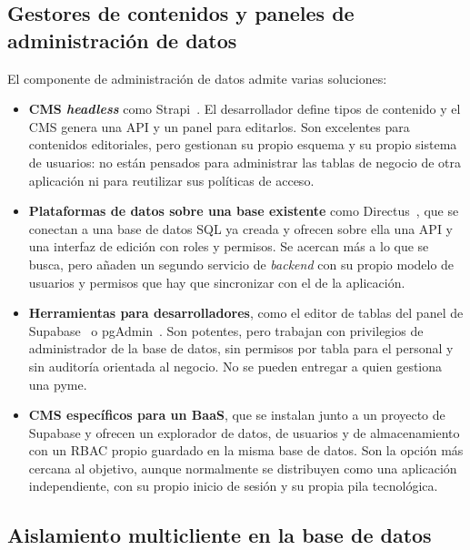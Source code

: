 \subsection{Gestores de contenidos y paneles de administración de datos}
\label{sec:ctx-cms}

El componente de administración de datos admite varias soluciones:

\begin{itemize}
  \item \textbf{CMS \textit{headless}} como Strapi~\cite{strapi-docs}. El
        desarrollador define tipos de contenido y el CMS genera una API y un
        panel para editarlos. Son excelentes para contenidos editoriales,
        pero gestionan su propio esquema y su propio sistema de usuarios: no
        están pensados para administrar las tablas de negocio de otra
        aplicación ni para reutilizar sus políticas de acceso.
  \item \textbf{Plataformas de datos sobre una base existente} como
        Directus~\cite{directus-docs}, que se conectan a una base de datos SQL
        ya creada y ofrecen sobre ella una API y una interfaz de edición con
        roles y permisos. Se acercan más a lo que se busca, pero añaden un
        segundo servicio de \textit{backend} con su propio modelo de usuarios
        y permisos que hay que sincronizar con el de la aplicación.
  \item \textbf{Herramientas para desarrolladores}, como el editor de tablas
        del panel de Supabase~\cite{supabase-docs} o pgAdmin~\cite{pgadmin}.
        Son potentes, pero trabajan con privilegios de administrador de la
        base de datos, sin permisos por tabla para el personal y sin
        auditoría orientada al negocio. No se pueden entregar a quien gestiona
        una pyme.
  \item \textbf{CMS específicos para un BaaS}, que se instalan junto a un
        proyecto de Supabase y ofrecen un explorador de datos, de usuarios y de
        almacenamiento con un RBAC propio guardado en la misma base de datos.
        Son la opción más cercana al objetivo, aunque normalmente se
        distribuyen como una aplicación independiente, con su propio inicio de
        sesión y su propia pila tecnológica.
\end{itemize}

\subsection{Aislamiento multicliente en la base de datos}
\label{sec:ctx-multitenancy}

